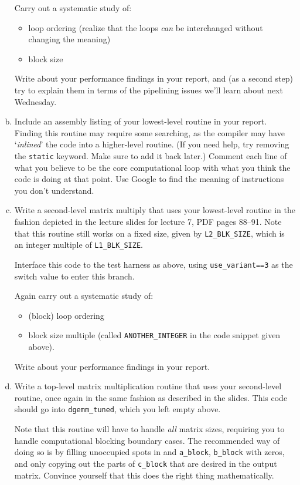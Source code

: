 \documentclass[11pt]{article}
\begin{document}
\begin{enumerate}[a)]
    Carry out a systematic study of:
    \begin{itemize}
      \item loop ordering (realize that the loops \emph{can} be
        interchanged without changing the meaning)
      \item block size
    \end{itemize}
    Write about your performance findings in your report, and (as a
    second step) try to explain them in terms of the pipelining issues
    we'll learn about next Wednesday.

  \item Include an assembly listing of your lowest-level routine
    in your report. Finding this routine may require some searching,
    as the compiler may have `\emph{inlined}' the code into a
    higher-level routine. (If you need help, try removing the
    \texttt{static} keyword. Make sure to add it back later.)
    Comment each line of what you believe to be the core computational
    loop with what you think the code is doing at that point. Use
    Google to find the meaning of instructions you don't understand.

  \item Write a second-level matrix multiply that uses your
    lowest-level routine in the fashion depicted in the lecture
    slides for lecture 7, PDF pages 88--91. Note that this routine
    still works on a fixed size, given by \texttt{L2\_BLK\_SIZE},
    which is an integer multiple of \texttt{L1\_BLK\_SIZE}.

    Interface this code to the test harness as above, using
    \texttt{use\_variant==3} as the switch value to enter this
    branch.

    Again carry out a systematic study of:
    \begin{itemize}
      \item (block) loop ordering
      \item block size multiple (called \texttt{ANOTHER\_INTEGER}
        in the code snippet given above).
    \end{itemize}
    Write about your performance findings in your report.

  \item Write a top-level matrix multiplication routine that uses your
    second-level routine, once again in the same fashion as described
    in the slides. This code should go into \texttt{dgemm\_tuned},
    which you left empty above.

    Note that this routine will have to handle
    \emph{all} matrix sizes, requiring you to handle computational
    blocking boundary cases. The recommended way of doing so is by
    filling unoccupied spots in and \texttt{a\_block},
    \texttt{b\_block} with zeros, and only copying out the parts of
    \texttt{c\_block} that are desired in the output matrix. Convince
    yourself that this does the right thing mathematically.


\end{enumerate}
\end{document}
